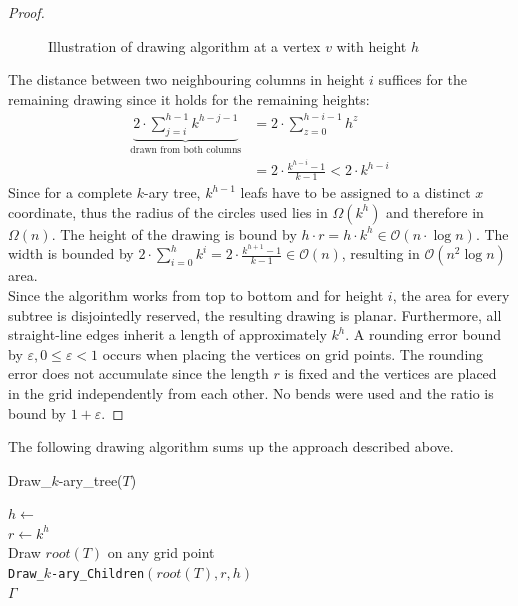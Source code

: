 \begin{proof}
\begin{figure}[H]
\begin{subfigure}{\textwidth}
		\end{subfigure}
	\caption{Illustration of drawing algorithm at a vertex $v$ with height $h$}\label{im:k-ary_trees_algorithm_illustration}
\end{figure}
	The distance between two neighbouring columns in height $i$ suffices for the remaining drawing since it holds for the remaining heights:
	\begin{align}
		\underbrace{2\cdot \sum_{j=i}^{h-1} k^{h-j-1}}_{\text{drawn from both columns}} &= 2\cdot\sum_{z = 0}^{h-i-1}h^z\\
		&= 2\cdot\frac{k^{h-i}-1}{k-1} < 2\cdot k^{h-i}
	\end{align}
	Since for a complete $k$-ary tree, $k^{h-1}$ leafs have to be assigned to a distinct $x$ coordinate, thus the radius of the circles used lies in $\Omega(k^h)$ and therefore in $\Omega(n)$.
	The height of the drawing is bound by $h\cdot r = h\cdot k^h \in \mathcal{O}(n\cdot \log n)$. The width is bounded by $2\cdot\sum_{i = 0}^{h} k^i = 2\cdot \frac{k^{h+1}-1}{k-1} \in \mathcal{O}(n)$, resulting in $\mathcal{O}(n^2\log n)$ area.\\ 
	Since the algorithm works from top to bottom and for height $i$, the area for every subtree is disjointedly reserved, the resulting drawing is planar. Furthermore, all straight-line edges inherit a length of approximately $k^h$. A rounding error bound by $\varepsilon, 0\leq \varepsilon<1$ occurs when placing the vertices on grid points. The rounding error does not accumulate since the length $r$ is fixed and the vertices are placed in the grid independently from each other. No bends were used and the ratio is bound by $1+\varepsilon$.
\end{proof}
\bigskip
The following drawing algorithm sums up the approach described above.\\
\begin{algorithm}[H]
	\caption{Draw\_$k$-ary\_tree($T$)}\label{al:complete_k-ary_tree}
	$h \gets $ \\
	$r \gets k^h$\\
	Draw $root(T)$ on any grid point\\
	\texttt{Draw\_$k$-ary\_Children}$(root(T),r,h)$\\
	\Return $\Gamma$
\end{algorithm}
